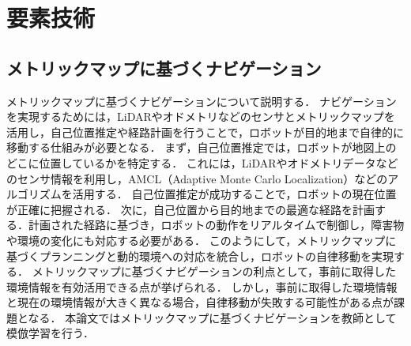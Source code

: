 \chapter{要素技術}
\section{メトリックマップに基づくナビゲーション}
メトリックマップに基づくナビゲーションについて説明する．
ナビゲーションを実現するためには，LiDARやオドメトリなどのセンサとメトリックマップを活用し，自己位置推定や経路計画を行うことで，ロボットが目的地まで自律的に移動する仕組みが必要となる．
まず，自己位置推定では，ロボットが地図上のどこに位置しているかを特定する．
これには，LiDARやオドメトリデータなどのセンサ情報を利用し，AMCL（Adaptive Monte Carlo Localization）などのアルゴリズムを活用する．
自己位置推定が成功することで，ロボットの現在位置が正確に把握される．
次に，自己位置から目的地までの最適な経路を計画する．計画された経路に基づき，ロボットの動作をリアルタイムで制御し，障害物や環境の変化にも対応する必要がある．
このようにして，メトリックマップに基づくプランニングと動的環境への対応を統合し，ロボットの自律移動を実現する．
メトリックマップに基づくナビゲーションの利点として，事前に取得した環境情報を有効活用できる点が挙げられる．
しかし，事前に取得した環境情報と現在の環境情報が大きく異なる場合，自律移動が失敗する可能性がある点が課題となる．
本論文ではメトリックマップに基づくナビゲーションを教師として模倣学習を行う．